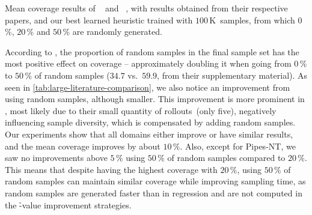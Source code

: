 \begin{table}[tb]
    \caption[Mean coverage results of our approach compared to those in the literature.]{Mean coverage results of \hboot~\cite{ferber2022neural} and \hnrsl~\cite{otoole2022sampling}, with results obtained from their respective papers, and our best learned heuristic trained with $100$\,K~samples, from which $0$\,\%, $20$\,\% and $50$\,\% are randomly generated.}
    \label{tab:large-literature-comparison}
    \addmargin
    \centering
    
\end{table}

According to \citet{otoole2022sampling}, the proportion of random samples in the final sample set has the most positive effect on coverage -- approximately doubling it when going from $0\,\%$ to $50\,\%$ of random samples ($34.7$ vs.~$59.9$, from their supplementary material). As seen in \cref{tab:large-literature-comparison}, we also notice an improvement from using random samples, although smaller. This improvement is more prominent in \citet{otoole2022sampling}, most likely due to their small quantity of rollouts~(only five), negatively influencing sample diversity, which is compensated by adding random samples. Our experiments show that all domains either improve or have similar results, and the mean coverage improves by about $10\,\%$. Also, except for Pipes-NT, we saw no improvements above $5\,\%$ using $50\,\%$ of random samples compared to $20\,\%$. This means that despite having the highest coverage with $20\,\%$, using $50\,\%$ of random samples can maintain similar coverage while improving sampling time, as random samples are generated faster than in regression and are not computed in the \h-value improvement strategies.
